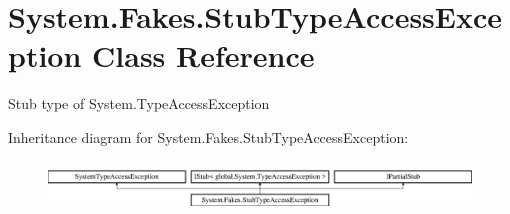 \hypertarget{class_system_1_1_fakes_1_1_stub_type_access_exception}{\section{System.\-Fakes.\-Stub\-Type\-Access\-Exception Class Reference}
\label{class_system_1_1_fakes_1_1_stub_type_access_exception}
}


Stub type of System.\-Type\-Access\-Exception 


Inheritance diagram for System.\-Fakes.\-Stub\-Type\-Access\-Exception\-:\begin{figure}[H]
\begin{center}
\leavevmode
\includegraphics[height=1.338112cm]{class_system_1_1_fakes_1_1_stub_type_access_exception}
\end{center}
\end{figure}
